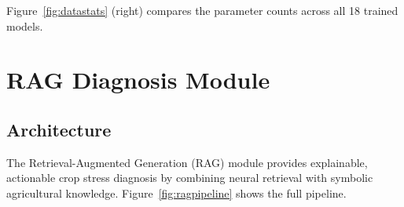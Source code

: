 \documentclass[conference]{IEEEtran}
\begin{document}
Figure~\ref{fig:datastats} (right) compares the parameter counts across all 18 trained models.

\section{RAG Diagnosis Module}
\label{sec:rag}

\subsection{Architecture}

The Retrieval-Augmented Generation (RAG) module provides explainable, actionable crop
stress diagnosis by combining neural retrieval with symbolic agricultural knowledge.
Figure~\ref{fig:ragpipeline} shows the full pipeline.
\end{document}
